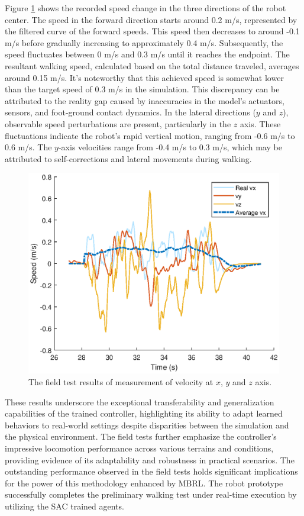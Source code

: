 Figure \ref{fig:real_v} shows the recorded speed change in the three directions of the robot center. The speed in the forward direction starts around 0.2 m/s, represented by the filtered curve of the forward speeds. This speed then decreases to around -0.1 m/s before gradually increasing to approximately 0.4 m/s. Subsequently, the speed fluctuates between 0 m/s and 0.3 m/s until it reaches the endpoint. The resultant walking speed, calculated based on the total distance traveled, averages around 0.15 m/s. It's noteworthy that this achieved speed is somewhat lower than the target speed of 0.3 m/s in the simulation. This discrepancy can be attributed to the reality gap caused by inaccuracies in the model's actuators, sensors, and foot-ground contact dynamics. In the lateral directions ($y$ and $z$), observable speed perturbations are present, particularly in the $z$ axis. These fluctuations indicate the robot's rapid vertical motion, ranging from -0.6 m/s to 0.6 m/s. The $y$-axis velocities range from -0.4 m/s to 0.3 m/s, which may be attributed to self-corrections and lateral movements during walking. 

\begin{figure}[htb]
    \centering
    \includegraphics[width=0.9\linewidth]{img/chap5/real_v.eps}
    \caption{The field test results of measurement of velocity at $x$, $y$ and $z$ axis.}
    \label{fig:real_v}
\end{figure}

These results underscore the exceptional transferability and generalization capabilities of the trained controller, highlighting its ability to adapt learned behaviors to real-world settings despite disparities between the simulation and the physical environment. The field tests further emphasize the controller's impressive locomotion performance across various terrains and conditions, providing evidence of its adaptability and robustness in practical scenarios. The outstanding performance observed in the field tests holds significant implications for the power of this methodology enhanced by MBRL. The robot prototype successfully completes the preliminary walking test under real-time execution by utilizing the SAC trained agents.